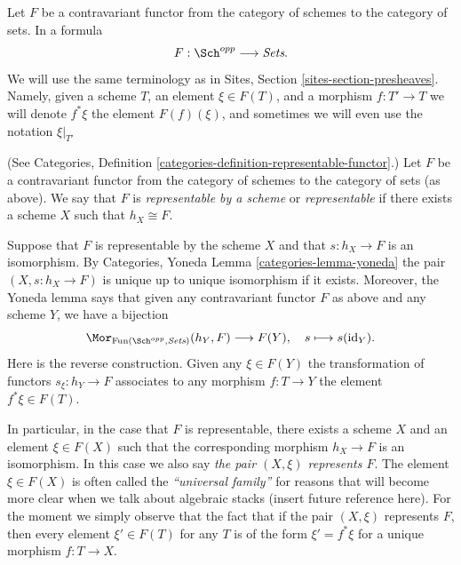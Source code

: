 \medskip\noindent
Let $F$ be a contravariant functor from the category
of schemes to the category of sets. In a formula
$$
F : \Sch^{opp}
\longrightarrow
\textit{Sets}.
$$
We will use the same terminology as in Sites, Section
\ref{sites-section-presheaves}. Namely, given a scheme
$T$, an element $\xi \in F(T)$, and a morphism $f : T' \to T$
we will denote $f^*\xi$ the element $F(f)(\xi)$, and sometimes
we will even use the notation $\xi|_{T'}$

\begin{definition}
\label{definition-representable-functor}
(See Categories, Definition \ref{categories-definition-representable-functor}.)
Let $F$ be a contravariant functor from the category
of schemes to the category of sets (as above).
We say that $F$ is {\it representable by a scheme}
or {\it representable} if there exists a scheme $X$
such that $h_X \cong F$.
\end{definition}

\noindent
Suppose that $F$ is representable by the scheme $X$ and that
$s : h_X \to F$ is an isomorphism.
By Categories, Yoneda Lemma \ref{categories-lemma-yoneda}
the pair $(X, s : h_X \to F)$ is unique up to unique
isomorphism if it exists.
Moreover, the Yoneda lemma says that
given any contravariant functor $F$ as above
and any scheme $Y$, we have a bijection
$$
\Mor_{\text{Fun}(\Sch^{opp}, \textit{Sets})} (h_Y, F)
\longrightarrow
F(Y), \quad
s \longmapsto s(\text{id}_Y).
$$
Here is the reverse construction. Given any $\xi \in F(Y)$
the transformation of functors $s_\xi : h_Y \to F$
associates to any morphism $f : T \to Y$ the
element $f^*\xi \in F(T)$.

\medskip\noindent
In particular, in the case that $F$ is representable, there exists
a scheme $X$ and an element $\xi \in F(X)$ such that the corresponding
morphism $h_X \to F$ is an isomorphism.
In this case we also say {\it the pair $(X, \xi)$ represents $F$}.
The element $\xi \in F(X)$
is often called the {\it ``universal family''} for reasons that will become
more clear when we talk about algebraic stacks (insert future reference here).
For the moment we simply observe that the fact that if the pair $(X, \xi)$
represents $F$, then every element $\xi' \in F(T)$ for any $T$ is of
the form $\xi' = f^*\xi$ for a unique morphism $f : T \to X$.

